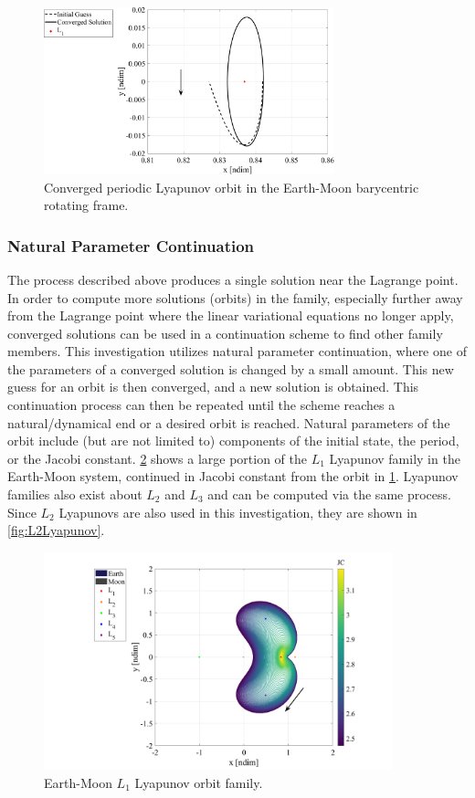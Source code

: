 \begin{figure}[ht]
    \centering
    \includegraphics[width=0.75\textwidth]{figures/Lyapunov.pdf}
    \caption{Converged periodic Lyapunov orbit in the Earth-Moon barycentric rotating frame.}
    \label{fig:Lyapunov}
\end{figure}

\subsubsection{Natural Parameter Continuation}
The process described above produces a single solution near the Lagrange point. In order to compute
more solutions (orbits) in the family, especially further away from the Lagrange point where the
linear variational equations no longer apply, converged solutions can be used in a continuation
scheme to find other family members. This investigation utilizes natural parameter continuation,
where one of the parameters of a converged solution is changed by a small amount. This new guess
for an orbit is then converged, and a new solution is obtained. This continuation process can then
be repeated until the scheme reaches a natural/dynamical end or a desired orbit is reached. Natural
parameters of the orbit include (but are not limited to) components of the initial state, the
period, or the Jacobi constant. \cref{fig:L1Lyapunov} shows a large portion of the $L_{1}$ Lyapunov
family in the Earth-Moon system, continued in Jacobi constant from the orbit in
\cref{fig:Lyapunov}. Lyapunov families also exist about $L_{2}$ and $L_{3}$ and can be computed via
the same process. Since $L_{2}$ Lyapunovs are also used in this investigation, they are shown in
\cref{fig:L2Lyapunov}.

\begin{figure}[ht]
    \centering
    \includegraphics[width=0.9\textwidth]{figures/L1LyapunovFamily.pdf}
    \caption{Earth-Moon $L_{1}$ Lyapunov orbit family.}
    \label{fig:L1Lyapunov}
\end{figure}

